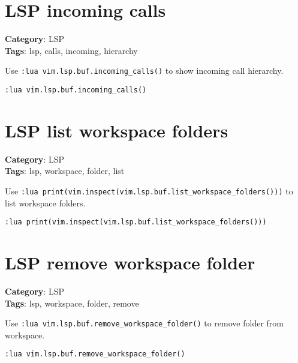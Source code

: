 {{{{{{\section{LSP incoming calls}

\textbf{Category}: LSP\\ \textbf{Tags}: lsp, calls, incoming, hierarchy
\vspace{0.5cm}

Use {\footnotesize \Verb§:lua vim.lsp.buf.incoming_calls()§} to show incoming call hierarchy.

\begin{Exa*}{}
\begin{Verbatim}[fontsize=\footnotesize, breaklines, breakanywhere]
:lua vim.lsp.buf.incoming_calls()
\end{Verbatim}
\end{Exa*}

\section{LSP list workspace folders}

\textbf{Category}: LSP\\ \textbf{Tags}: lsp, workspace, folder, list
\vspace{0.5cm}

Use {\footnotesize \Verb§:lua print(vim.inspect(vim.lsp.buf.list_workspace_folders()))§} to list workspace folders.

\begin{Exa*}{}
\begin{Verbatim}[fontsize=\footnotesize, breaklines, breakanywhere]
:lua print(vim.inspect(vim.lsp.buf.list_workspace_folders()))
\end{Verbatim}
\end{Exa*}

\section{LSP remove workspace folder}

\textbf{Category}: LSP\\ \textbf{Tags}: lsp, workspace, folder, remove
\vspace{0.5cm}

Use {\footnotesize \Verb§:lua vim.lsp.buf.remove_workspace_folder()§} to remove folder from workspace.

\begin{Exa*}{}
\begin{Verbatim}[fontsize=\footnotesize, breaklines, breakanywhere]
:lua vim.lsp.buf.remove_workspace_folder()
\end{Verbatim}
\end{Exa*}

}}}}}}
